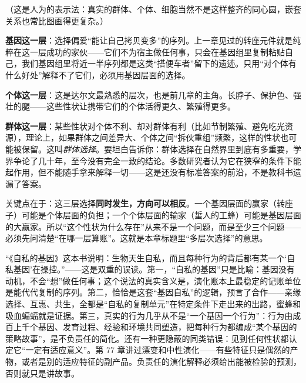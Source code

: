 \begin{center}
\end{center}

（这是人为的表示法：真实的群体、个体、细胞当然不是这样整齐的同心圆，嵌套关系也常比图画得更复杂。）

\textbf{基因这一层}：选择偏爱“能让自己拷贝变多”的序列。上一章见过的转座元件就是纯粹在这一层成功的家伙——它们不为宿主做任何事，只会在基因组里复制粘贴自己，我们基因组里将近一半序列都是这类“搭便车者”留下的遗迹。只用“对个体有什么好处”解释不了它们，必须用基因层面的选择。

\textbf{个体这一层}：这是达尔文最熟悉的层次，也是前几章的主角。长脖子、保护色、强壮的腿——这些性状让携带它们的个体活得更久、繁殖得更多。

\textbf{群体这一层}：某些性状对个体不利、却对群体有利（比如节制繁殖、避免吃光资源），理论上，如果群体之间差异大、个体之间“拆伙重组”频繁，这样的性状也可能被保留。这叫\emph{群体选择}。要坦白告诉你：群体选择在自然界里到底有多重要，学界争论了几十年，至今没有完全一致的结论。多数研究者认为它在狭窄的条件下能起作用，但不能随手拿来解释一切——这是还没有标准答案的前沿，不是教科书遗漏了答案。

关键点在于：这三层选择\textbf{同时发生，方向可以相反}。一个基因层面的赢家（转座子）可能是个体层面的负担；一个个体层面的输家（蜇人的工蜂）可能是基因层面的大赢家。所以“这个性状为什么存在”从来不是一个问题，而是至少三个问题——必须先问清楚“在哪一层算账”。这就是本章标题里“多层次选择”的意思。

\begin{wuqu}
“《自私的基因》这本书说明：生物天生自私，而且每种行为的背后都有某一个‘自私基因’在操控。”——这是双重的误读。第一，“自私的基因”只是比喻：基因没有动机，不会“想”做任何事；这个说法的真实含义是，演化账本上最稳定的记账单位是能代代复制的序列。第二，恰恰是这套“基因自私”的逻辑，预言了合作——亲缘选择、互惠、共生，全都是“自私的复制单元”在特定条件下走出来的出路，蜜蜂和吸血蝙蝠就是证据。第三，真实的行为几乎从不是“一个基因一个行为”：行为由成百上千个基因、发育过程、经验和环境共同塑造，把每种行为都编成“某个基因的策略故事”，是不负责任的简化。还有一种更隐蔽的同类错误：见到任何性状都认定它“一定有适应意义”。第 77 章讲过漂变和中性演化——有些特征只是偶然的产物，或者是别的适应特征的副产品。负责任的演化解释必须给出能被检验的预测，否则就只是讲故事。
\end{wuqu}

